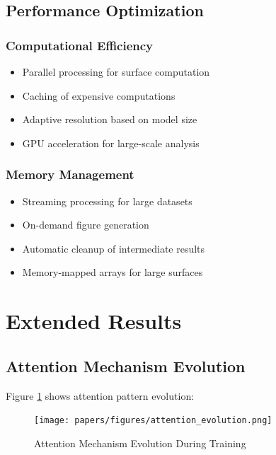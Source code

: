 \documentclass[12pt,a4paper]{article}
\begin{document}
\subsection{Performance Optimization}

\subsubsection{Computational Efficiency}

\begin{itemize}
    \item Parallel processing for surface computation
    \item Caching of expensive computations
    \item Adaptive resolution based on model size
    \item GPU acceleration for large-scale analysis
\end{itemize}

\subsubsection{Memory Management}

\begin{itemize}
    \item Streaming processing for large datasets
    \item On-demand figure generation
    \item Automatic cleanup of intermediate results
    \item Memory-mapped arrays for large surfaces
\end{itemize}

\section{Extended Results}
\label{app:extended-results}

\subsection{Attention Mechanism Evolution}

Figure \ref{fig:attention-evolution} shows attention pattern evolution:

\begin{figure}[H]
\centering
\texttt{[image: papers/figures/attention\_evolution.png]}
\caption{Attention Mechanism Evolution During Training}
\label{fig:attention-evolution}
\end{figure}
\end{document}
